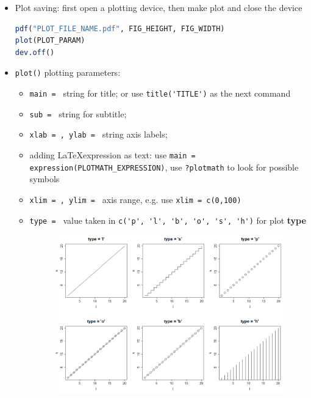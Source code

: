 \begin{itemize}[topsep=2pt,itemsep=0pt]
    \item Plot saving: first open a plotting device, then make plot and close the device
\begin{lstlisting}[language=R]
pdf("PLOT_FILE_NAME.pdf", FIG_HEIGHT, FIG_WIDTH)
plot(PLOT_PARAM)
dev.off()
\end{lstlisting}
    \item \lstinline|plot()| plotting parameters:
    \begin{itemize}[topsep=2pt,itemsep=0pt]
        \item \lstinline|main = | string for title; or use \lstinline|title('TITLE')| as the next command
        \item \lstinline|sub = | string for subtitle;
        \item \lstinline|xlab = , ylab = | string axis labels;
            \item adding \LaTeX expression as text: use \lstinline|main = expression(PLOTMATH_EXPRESSION)|, use \lstinline|?plotmath| to look for possible symbols
        \item \lstinline|xlim = , ylim = | axis range, e.g. use \lstinline|xlim = c(0,100)|
        \item \lstinline|type = | value taken in \lstinline|c('p', 'l', 'b', 'o', 's', 'h')| for plot \textbf{type}
        \begin{figure}[H]
            \centering
            \includegraphics[width=0.8\linewidth]{sections/images/2022-08-18-11-24-35.png}

            \label{}
        \end{figure}
        

\end{itemize}
\end{itemize}
